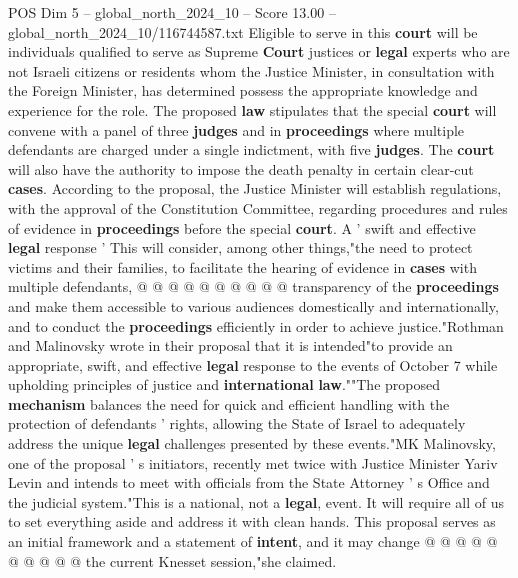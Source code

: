 \begin{textsample}{POS Dim 5 – global\_north\_2024\_10 – Score 13.00 – global\_north\_2024\_10/116744587.txt}
Eligible to serve in this \textbf{court} will be individuals qualified to serve as Supreme \textbf{Court} justices or \textbf{legal} experts who are not Israeli citizens or residents whom the Justice Minister, in consultation with the Foreign Minister, has determined possess the appropriate knowledge and experience for the role.
The proposed \textbf{law} stipulates that the special \textbf{court} will convene with a panel of three \textbf{judges} and in \textbf{proceedings} where multiple defendants are charged under a single indictment, with five \textbf{judges}.
The \textbf{court} will also have the authority to impose the death penalty in certain clear-cut \textbf{cases}.
According to the proposal, the Justice Minister will establish regulations, with the approval of the Constitution Committee, regarding procedures and rules of evidence in \textbf{proceedings} before the special \textbf{court}.
A ' swift and effective \textbf{legal} response ' This will consider, among other things,"the need to protect victims and their families, to facilitate the hearing of evidence in \textbf{cases} with multiple defendants, @ @ @ @ @ @ @ @ @ @ transparency of the \textbf{proceedings} and make them accessible to various audiences domestically and internationally, and to conduct the \textbf{proceedings} efficiently in order to achieve justice."Rothman and Malinovsky wrote in their proposal that it is intended"to provide an appropriate, swift, and effective \textbf{legal} response to the events of October 7 while upholding principles of justice and \textbf{international} \textbf{law}.""The proposed \textbf{mechanism} balances the need for quick and efficient handling with the protection of defendants ' rights, allowing the State of Israel to adequately address the unique \textbf{legal} challenges presented by these events."MK Malinovsky, one of the proposal ' s initiators, recently met twice with Justice Minister Yariv Levin and intends to meet with officials from the State Attorney ' s Office and the judicial system."This is a national, not a \textbf{legal}, event.
It will require all of us to set everything aside and address it with clean hands.
This proposal serves as an initial framework and a statement of \textbf{intent}, and it may change @ @ @ @ @ @ @ @ @ @ the current Knesset session,"she claimed.

\end{textsample}
